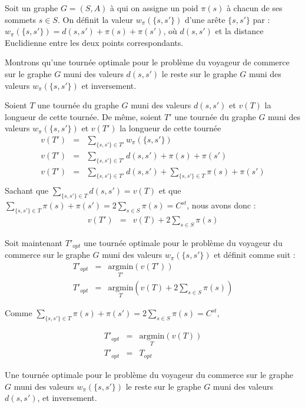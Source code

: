 Soit un graphe $G = (S,A)$ à qui on assigne un poid $\pi(s)$ à chacun de ses sommets $s \in S$. On définit la valeur $w_\pi(\{s,s'\})$ d'une arête $\{s,s'\}$ par : $w_\pi(\{s,s'\})=d(s,s')+\pi(s)+\pi(s')$, où $d(s,s')$ et la distance Euclidienne entre les deux points correspondants.

Montrons qu'une tournée optimale pour le problème du voyageur de commerce sur le graphe $G$ muni des valeurs $d(s,s')$ le reste sur le graphe $G$ muni des valeurs $w_\pi(\{s,s'\})$ et inversement.

Soient $T$ une tournée du graphe $G$ muni des valeurs $d(s,s')$ et $v(T)$ la longueur de cette tournée. De même, soient $T'$ une tournée du graphe $G$ muni des valeurs $w_\pi(\{s,s'\})$ et $v(T')$ la longueur de cette tournée\\


\begin{equation*}
\begin{array}{rcl}
v(T') &= &\underset{\{s, s'\}\in T'}{\sum}w_\pi(\{s,s'\}) \\
v(T') &= &\underset{\{s, s'\}\in T'}{\sum}d(s,s')+\pi(s)+\pi(s') \\
v(T') &= &\underset{\{s, s'\}\in T'}{\sum}d(s,s')+\underset{\{s, s'\}\in T}{\sum}\pi(s)+\pi(s')\\
\end{array}
\end{equation*}
Sachant que $\underset{\{s, s'\}\in T}{\sum}d(s,s')=v(T)$ et que $\underset{\{s, s'\}\in T}{\sum}\pi(s)+\pi(s')=2\underset{s\in S}{\sum}\pi(s)=C^{st}$, nous avons donc :
\begin{equation*}
\boxed{
\begin{array}{rcl}
v(T') &= &v(T)+2\underset{s\in S}{\sum}\pi(s)
\end{array}
}
\end{equation*}

Soit maintenant $T'_{opt}$ une tournée optimale pour le problème du voyageur du commerce sur le graphe $G$ muni des valeurs $w_\pi(\{s,s'\})$ et définit comme suit :
\begin{equation*}
\begin{array}{rcl}
T'_{opt} &= &\underset{T'}{\mathrm{argmin}}\left(v(T')\right) \\
T'_{opt} &= &\underset{T}{\mathrm{argmin}}\left(v(T)+2\underset{s\in S}{\sum}\pi(s)\right)
\end{array}
\end{equation*}

Comme $\underset{\{s, s'\}\in T}{\sum}\pi(s)+\pi(s')=2\underset{s\in S}{\sum}\pi(s)=C^{st}$,

\begin{equation*}
\boxed{
\begin{array}{rcl}
T'_{opt} &= &\underset{T}{\mathrm{argmin}}\left(v(T)\right) \\
T'_{opt} &= &T_{opt}
\end{array}
}
\end{equation*}

Une tournée optimale pour le problème du voyageur du commerce sur le graphe $G$ muni des valeurs $w_\pi(\{s,s'\})$ le reste sur le graphe $G$ muni des valeurs $d(s,s')$, et inversement.